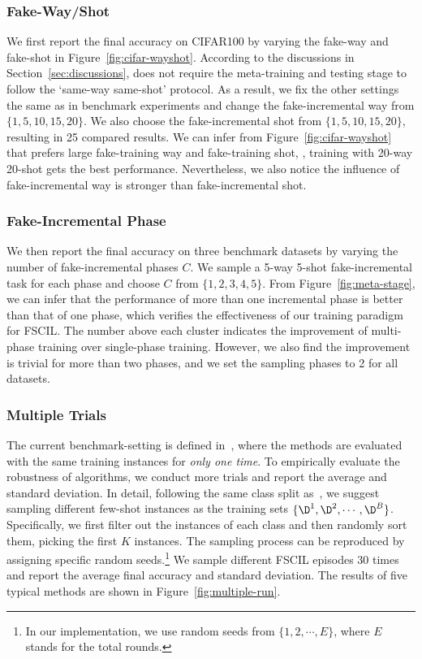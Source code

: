 \subsubsection{Fake-Way/Shot}
We first report the final accuracy on CIFAR100 by varying the fake-way and fake-shot in Figure~\ref{fig:cifar-wayshot}.
According to the discussions in Section~\ref{sec:discussions}, \name does not require the meta-training and testing stage to follow the `same-way same-shot' protocol. As a result, we fix the other settings the same as in benchmark experiments and change the fake-incremental way from $\{1, 5, 10, 15, 20\}$. We also choose the fake-incremental shot from $\{1, 5, 10, 15, 20\}$, resulting in 25 compared results. We can infer from Figure~\ref{fig:cifar-wayshot} that \name prefers large fake-training way and fake-training shot, \ie, training with 20-way 20-shot gets the best performance. Nevertheless, we also notice the influence of fake-incremental way is stronger than fake-incremental shot.

\subsubsection{Fake-Incremental Phase}
We then report the final accuracy on three benchmark datasets by varying the number of fake-incremental phases $C$. 
We sample a 5-way 5-shot fake-incremental task for each phase and choose $C$ from $\{1, 2, 3, 4, 5\}$. 
From Figure~\ref{fig:meta-stage}, we can infer that the performance of more than one incremental phase is better than that of one phase, which verifies the effectiveness of our training paradigm for FSCIL.
The number above each cluster indicates the improvement of multi-phase training over single-phase training.
However, we also find the improvement is trivial for more than two phases, and we set the sampling phases to 2 for all datasets.



\subsubsection{Multiple Trials}
The current benchmark-setting is defined in~\cite{tao2020few}, where the methods are evaluated with the same training instances for \emph{only one time}. To empirically evaluate the robustness of algorithms, we conduct more trials and report the average and standard deviation.
In detail, following the same class split as~\cite{tao2020few}, we suggest sampling different few-shot instances as the training sets $\{\D^1,\D^2,\cdots,\D^B\}$. Specifically, we first filter out the instances of each class and then randomly sort them, picking the first $K$ instances. The sampling process can be reproduced by assigning specific random seeds.\footnote{In our implementation, we use random seeds from $\{1,2,\cdots, E\}$, where $E$ stands for the total rounds.} 
We sample different FSCIL episodes 30 times and report the average final accuracy and standard deviation. The results of five typical methods are shown in Figure~\ref{fig:multiple-run}.

